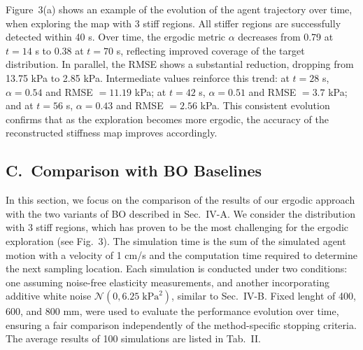 \documentclass[11pt]{article}
\begin{document}
Figure~3(a) shows an example of the evolution of the agent trajectory
over time, when exploring the map with 3 stiff regions. All stiffer
regions are successfully detected within 40 s. Over time, the
ergodic metric $\alpha$ decreases from 0.79 at $t = 14$ s to 0.38 at
$t = 70$ s, reflecting improved coverage of the target distribution.
In parallel, the RMSE shows a substantial reduction, dropping from
13.75 kPa to 2.85 kPa. Intermediate values reinforce this trend: at
$t = 28$ s, $\alpha = 0.54$ and RMSE $= 11.19$ kPa; at $t = 42$ s,
$\alpha = 0.51$ and RMSE $= 3.7$ kPa; and at $t = 56$ s,
$\alpha = 0.43$ and RMSE $= 2.56$ kPa. This consistent evolution
confirms that as the exploration becomes more ergodic, the accuracy
of the reconstructed stiffness map improves accordingly.

\subsection*{C.\ Comparison with BO Baselines}

In this section, we focus on the comparison of the results of our
ergodic approach with the two variants of BO described in Sec.~IV-A.
We consider the distribution with 3 stiff regions, which has proven
to be the most challenging for the ergodic exploration (see Fig.~3).
The simulation time is the sum of the simulated agent motion with a
velocity of 1 cm/s and the computation time required to determine
the next sampling location. Each simulation is conducted under two
conditions: one assuming noise-free elasticity measurements, and
another incorporating additive white noise
$\mathcal{N}(0, 6.25\;\mathrm{kPa}^{2})$, similar to Sec.~IV-B. Fixed
lenght of 400, 600, and 800 mm, were used to evaluate the performance
evolution over time, ensuring a fair comparison independently of the
method-specific stopping criteria. The average results of 100
simulations are listed in Tab.~II.
\end{document}
